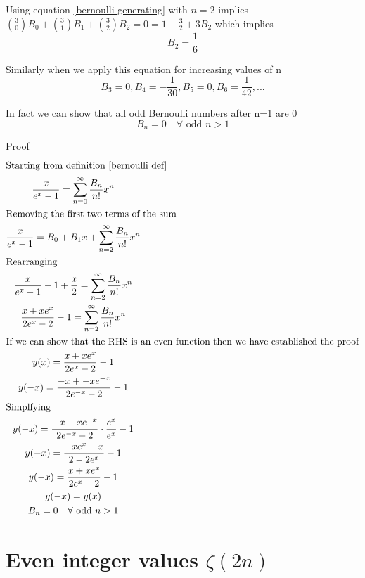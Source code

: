 \documentclass[a4paper]{article}
\begin{document}
Using equation \ref{bernoulli generating} with $n=2$ implies $ \binom{3}{0} B_0 + \binom{3}{1} B_1 + \binom{3}{2} B_2 = 0 = 1 - \frac{3}{2} + 3 B_2 $ which implies 
\begin{equation}
B_2 = \frac{1}{6}
\end{equation}

Similarly when we apply this equation for increasing values of n
\begin{equation}
B_3 = 0, B_4 = -\frac{1}{30}, B_5 = 0, B_6 = \frac{1}{42}, ...
\end{equation}


\begin{theorem}
In fact we can show that all odd Bernoulli numbers after n=1 are 0
\begin{equation} \label{odd bernoulli} B_n = 0  \quad \forall \text{ odd }n > 1
\end{equation}

Proof
\begin{gather*}
\intertext{Starting from definition \ref{bernoulli def}}
\frac{x}{e^x -1} = \sum_{n=0}^{\infty} \frac{B_n}{n!} x^n
\\
\intertext{Removing the first two terms of the sum}
\frac{x}{e^x -1} = B_0 + B_1 x + \sum_{n=2}^{\infty} \frac{B_n}{n!} x^n\\
\intertext{Rearranging}
\frac{x}{e^x -1}  - 1 + \frac{x}{2}= \sum_{n=2}^{\infty} \frac{B_n}{n!} x^n
\\
\frac{x + xe^x}{2e^x -2}  - 1 = \sum_{n=2}^{\infty} \frac{B_n}{n!} x^n
\\
\intertext{If we can show that the RHS is an even function then we have established the proof}
y(x) = \frac{x + xe^x}{2e^x -2}  - 1
\\
y(-x) = \frac{-x + -xe^{-x}}{2e^{-x} -2}  - 1
\\
\intertext{Simplfying}
y(-x) = \frac{-x -xe^{-x}}{2e^{-x} -2} \cdot \frac{e^x}{e^x}  - 1
\\
y(-x) = \frac{-xe^x -x}{2 -2e^x}  - 1
\\
y(-x) = \frac{x+xe^x}{2e^x - 2}  - 1
\\
y(-x) = y(x)
\\
B_n = 0  \quad \forall \text{ odd }n > 1
\end{gather*}
\end{theorem}

\pagebreak

\section{Even integer values $\zeta(2n)$}
\end{document}
